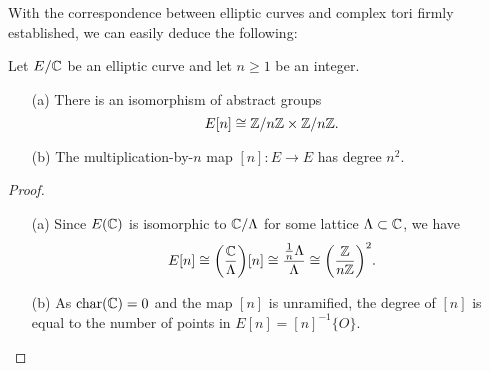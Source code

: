 With the correspondence between elliptic curves and complex tori firmly established, we can easily deduce the following:\\

\begin{prop}\cite{Silverman_2009}
	\label{torsion_prop}
	Let $E/\mathbb{C}$ be an elliptic curve and let $n \geq 1$ be an integer.
	\begin{enumerate}
		\item[(a)] There is an isomorphism of abstract groups
		\begin{equation*}
			E[n] \cong \mathbb{Z}/n\mathbb{Z} \times \mathbb{Z}/n\mathbb{Z}.
		\end{equation*}
		\item[(b)] The multiplication-by-$n$ map $[n]:E \rightarrow E$ has degree $n^{2}$.
	\end{enumerate}
\end{prop}

\begin{proof}
	\begin{enumerate}
		\item[(a)] Since $E(\mathbb{C})$ is isomorphic to $\mathbb{C}/\Lambda$ for some lattice $\Lambda \subset \mathbb{C}$, we have
		\begin{equation*}
		E[n] \cong \bigg(\frac{\mathbb{C}}{\Lambda}\bigg)[n] \cong \frac{\frac{1}{n}\Lambda}{\Lambda} \cong \bigg(\frac{\mathbb{Z}}{n\mathbb{Z}}\bigg)^{2}.
		\end{equation*}
		\item[(b)] As $\operatorname{char}(\mathbb{C}) = 0$ and the map $[n]$ is unramified, the degree of $[n]$ is equal to the number of points in $E[n] = [n]^{-1}\{O\}$.
	\end{enumerate}
\end{proof}
